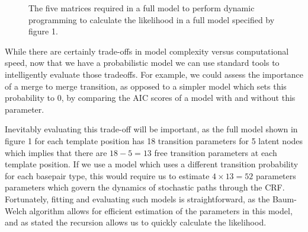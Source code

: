 \documentclass[fleqn,10pt]{SelfArx} %
\begin{document}
\begin{figure} %
		\caption{The five matrices required in a full model to perform dynamic programming to calculate the likelihood in a full model specified by figure 1. }				
\end{figure}


While there are certainly trade-offs in model complexity versus computational speed, now that we have a probabilistic model we can use standard tools to intelligently evaluate those tradeoffs.  For example, we could assess the importance of a merge to merge transition, as opposed to a simpler model which sets this probability to 0, by comparing the AIC scores of a model with and without this parameter.

Inevitably evaluating this trade-off will be important, as the full model shown in figure 1 for each template position has 18 transition parameters for 5 latent nodes which implies that there are $18-5 = 13$ free transition parameters at each template position.  If we use a model which uses a different transition probability for each basepair type, this would require us to estimate $4 \times 13 = 52$ parameters parameters which govern the dynamics of stochastic paths through the CRF.  Fortunately, fitting and evaluating such models is straightforward, as the Baum-Welch algorithm allows for efficient estimation of the parameters in this model, and as stated the recursion allows us to quickly calculate the likelihood.
\end{document}
